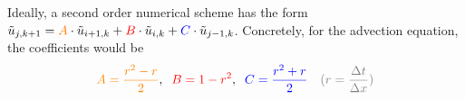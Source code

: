 
Ideally, a second order numerical scheme has the form
$\tilde{u}_{j,k+1}={\color{orange}A}\cdot\tilde{u}_{i+1,k}+{\color{red}B}\cdot\tilde{u}_{i,k}+{\color{blue}C}\cdot\tilde{u}_{j-1,k}$.
Concretely, for the advection equation, the coefficients would be
\begin{align*}
	{\color{orange} A={\frac{r^{2}-r}{2}}},\;\;{\color{red} B=1-r^{2}},\;\;
	{\color{blue} C={\frac{r^{2}+r}{2}}}\quad
	{\color{gray} (r = \frac{\Delta t}{\Delta x})}
\end{align*}

